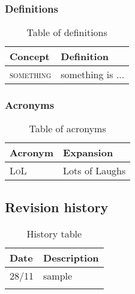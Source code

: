 \subsubsection{Definitions}
\label{sec:definitions}
\begin{table}[H]
    \setlength\arrayrulewidth{1pt}
    \centering
    \begin{tabular}{|m{}|m{}|}
        \rowcolor{myblue}
        \hline
        \color{white}Concept & \color{white}Definition \\
        \hline
        \textsc{something}     &   something is ... \\
        \hline
    \end{tabular}
    
    \caption{\label{tab:def}Table of definitions}
    
\end{table}

\subsubsection{Acronyms}
\label{sec:acronyms}

\begin{table}[H]
    \setlength\arrayrulewidth{1pt}
    \centering
    \begin{tabular}{|l|l|}
        \rowcolor{myblue}
        \hline
        \color{white}Acronym & \color{white}Expansion \\
        \hline
        \textsc{LoL}  &    Lots of Laughs \\
        \hline
        
    \end{tabular}
    
    \caption{\label{tab:acronymsTable}Table of acronyms}
    
\end{table}

\subsection{Revision history}
\label{sec:history}
\begin{center}
    \setlength\arrayrulewidth{1pt}
    \begin{longtable}{ll}
        
        \hline
        \rowcolor{myblue}\color{white}Date & \color{white}Description \\
        \hline
        28/11	&	sample\\
        \hline
        
        \rowcolor{white}\caption{\label{tab:history}History table}
        
    \end{longtable}
\end{center}
